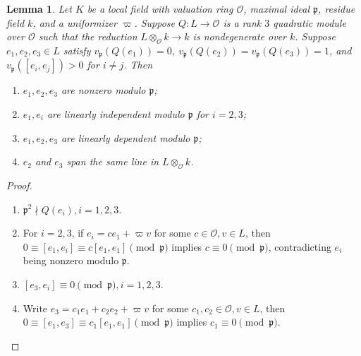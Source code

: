\documentclass{amsart}
\numberwithin{equation}{subsection}
\numberwithin{theorem}{section}
\newtheorem{lemma}[theorem]{Lemma}
\theoremstyle{definition}
\theoremstyle{remark}
\begin{document}
\begin{lemma}\label{lem:nondeg}
        Let $K$ be a local field with  valuation ring $\mathcal{O}$, maximal ideal $\mathfrak{p}$, residue field $k$, and a uniformizer $\varpi$. Suppose $Q: L \to \mathcal{O}$ is a rank $3$ quadratic module over $\mathcal{O}$ such that the reduction $ L \otimes_{\mathcal{O}} k \to k$ is nondegenerate over $k$. Suppose $e_1, e_2, e_3\in L$ satisfy $v_\mathfrak{p}(Q(e_1)) = 0$, $v_\mathfrak{p}(Q(e_2)) = v_\mathfrak{p}(Q(e_3)) = 1$, and $v_{\mathfrak{p}}([e_i, e_j]) > 0$ for $i\neq j$. Then 
        \begin{enumerate}[label=(\arabic*)]
            \item $e_1, e_2, e_3$ are nonzero modulo $\mathfrak{p}$;
            \item $e_1, e_i$ are linearly independent modulo $\mathfrak{p}$ for $i=2,3$;
            \item $e_1, e_2, e_3$ are linearly dependent modulo $\mathfrak{p}$;
            \item $e_2$ and $e_3$ span the same line in $L \otimes_{\mathcal{O}} k$. 
        \end{enumerate}
    \end{lemma}
    \begin{proof}
       \begin{enumerate}[label=(\arabic*)]
            \item $\mathfrak{p}^2\nmid Q(e_i), i=1,2,3$.
            \item For $i=2,3$, if $e_i = c e_1 + \varpi v$ for some $c\in \mathcal{O}, v\in L$, then $0 \equiv [e_1, e_i] \equiv c[e_1, e_1] \pmod{\mathfrak{p}}$ implies $c\equiv 0 \pmod{\mathfrak{p}}$, contradicting $e_i$ being nonzero modulo $\mathfrak{p}$. 
            \item $[e_3, e_i] \equiv 0 \pmod{\mathfrak{p}}, i = 1,2,3$.
            \item Write $e_3 = c_1 e_1+c_2e_2+\varpi v$ for some $c_1, c_2\in\mathcal{O}, v\in L$, then $ 0 \equiv [e_1, e_3] \equiv c_1[e_1, e_1] \pmod{\mathfrak{p}}$ implies $c_1\equiv 0\pmod{\mathfrak{p}}$.
        \end{enumerate}
    \end{proof}
    
\end{document}
